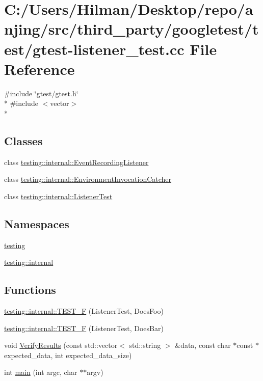 \hypertarget{gtest-listener__test_8cc}{}\section{C\+:/\+Users/\+Hilman/\+Desktop/repo/anjing/src/third\+\_\+party/googletest/test/gtest-\/listener\+\_\+test.cc File Reference}
\label{gtest-listener__test_8cc}
{\ttfamily \#include \char`\"{}gtest/gtest.\+h\char`\"{}}\\*
{\ttfamily \#include $<$vector$>$}\\*
\subsection*{Classes}
\begin{DoxyCompactItemize}
\item 
class \hyperlink{classtesting_1_1internal_1_1_event_recording_listener}{testing\+::internal\+::\+Event\+Recording\+Listener}
\item 
class \hyperlink{classtesting_1_1internal_1_1_environment_invocation_catcher}{testing\+::internal\+::\+Environment\+Invocation\+Catcher}
\item 
class \hyperlink{classtesting_1_1internal_1_1_listener_test}{testing\+::internal\+::\+Listener\+Test}
\end{DoxyCompactItemize}
\subsection*{Namespaces}
\begin{DoxyCompactItemize}
\item 
 \hyperlink{namespacetesting}{testing}
\item 
 \hyperlink{namespacetesting_1_1internal}{testing\+::internal}
\end{DoxyCompactItemize}
\subsection*{Functions}
\begin{DoxyCompactItemize}
\item 
\hyperlink{namespacetesting_1_1internal_a7e113e9c70d45d89fe1703e58ff083b9}{testing\+::internal\+::\+T\+E\+S\+T\+\_\+\+F} (Listener\+Test, Does\+Foo)
\item 
\hyperlink{namespacetesting_1_1internal_a02cef32090020d164460dd3d9f8e2852}{testing\+::internal\+::\+T\+E\+S\+T\+\_\+\+F} (Listener\+Test, Does\+Bar)
\item 
void \hyperlink{gtest-listener__test_8cc_a37b76c7cfb416feefdc2a49fde18db7e}{Verify\+Results} (const std\+::vector$<$ std\+::string $>$ \&data, const char $\ast$const $\ast$expected\+\_\+data, int expected\+\_\+data\+\_\+size)
\item 
int \hyperlink{gtest-listener__test_8cc_a3c04138a5bfe5d72780bb7e82a18e627}{main} (int argc, char $\ast$$\ast$argv)
\end{DoxyCompactItemize}
